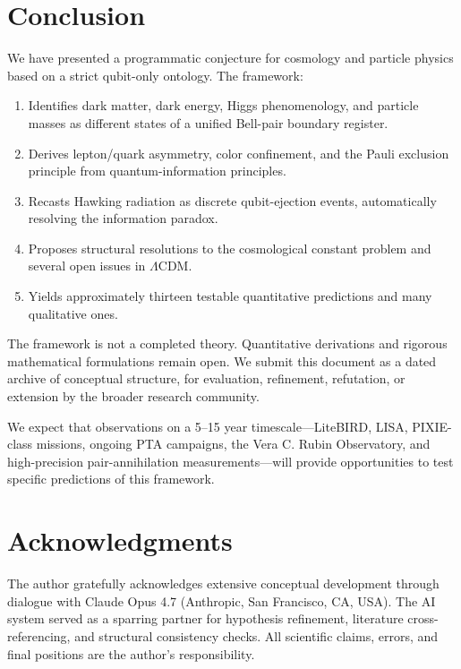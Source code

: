\documentclass[11pt,a4paper]{article}
\begin{document}
\section{Conclusion}
\label{sec:conclusion}

We have presented a programmatic conjecture for cosmology and particle physics based on a strict qubit-only ontology. The framework:

\begin{enumerate}[leftmargin=*]
\item Identifies dark matter, dark energy, Higgs phenomenology, and particle masses as different states of a unified Bell-pair boundary register.
\item Derives lepton/quark asymmetry, color confinement, and the Pauli exclusion principle from quantum-information principles.
\item Recasts Hawking radiation as discrete qubit-ejection events, automatically resolving the information paradox.
\item Proposes structural resolutions to the cosmological constant problem and several open issues in $\Lambda$CDM.
\item Yields approximately thirteen testable quantitative predictions and many qualitative ones.
\end{enumerate}

The framework is not a completed theory. Quantitative derivations and rigorous mathematical formulations remain open. We submit this document as a dated archive of conceptual structure, for evaluation, refinement, refutation, or extension by the broader research community.

We expect that observations on a 5--15 year timescale---LiteBIRD, LISA, PIXIE-class missions, ongoing PTA campaigns, the Vera C. Rubin Observatory, and high-precision pair-annihilation measurements---will provide opportunities to test specific predictions of this framework.

\section*{Acknowledgments}

The author gratefully acknowledges extensive conceptual development through dialogue with Claude Opus 4.7 (Anthropic, San Francisco, CA, USA). The AI system served as a sparring partner for hypothesis refinement, literature cross-referencing, and structural consistency checks. All scientific claims, errors, and final positions are the author's responsibility.
\end{document}
